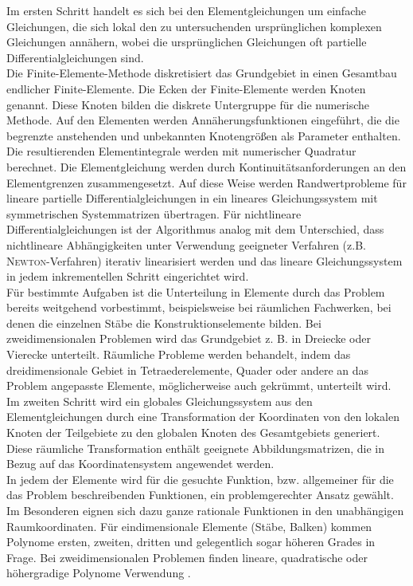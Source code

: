 \documentclass[a4paper,10pt,twoside]{article}
\numberwithin{equation}{section} %
\numberwithin{figure}{section}   %
\numberwithin{table}{section}    %
\begin{document}
	Im ersten Schritt handelt es sich bei den Elementgleichungen um einfache Gleichungen, die sich lokal den zu untersuchenden ursprünglichen komplexen Gleichungen annähern, wobei die ursprünglichen Gleichungen oft partielle Differentialgleichungen sind.\\
	
	Die Finite-Elemente-Methode diskretisiert das Grundgebiet in einen Gesamtbau endlicher Finite-Elemente. Die Ecken der Finite-Elemente werden Knoten genannt. Diese Knoten bilden die diskrete Untergruppe für die numerische Methode. Auf den Elementen werden Annäherungsfunktionen eingeführt, die die begrenzte anstehenden und unbekannten Knotengrößen als Parameter enthalten. Die resultierenden Elementintegrale werden mit numerischer Quadratur berechnet. Die Elementgleichung werden durch Kontinuitätsanforderungen an den Elementgrenzen zusammengesetzt. Auf diese Weise werden Randwertprobleme für lineare partielle Differentialgleichungen in ein lineares Gleichungssystem mit symmetrischen Systemmatrizen übertragen. Für nichtlineare Differentialgleichungen ist der Algorithmus analog mit dem Unterschied, dass nichtlineare Abhängigkeiten unter Verwendung geeigneter Verfahren (z.B. \textsc{Newton}-Verfahren) iterativ linearisiert werden und das lineare Gleichungssystem in jedem inkrementellen Schritt eingerichtet wird.\\
	
	Für bestimmte Aufgaben ist die Unterteilung in Elemente durch das Problem bereits weitgehend vorbestimmt, beispielsweise bei räumlichen Fachwerken, bei denen die einzelnen Stäbe die Konstruktionselemente bilden. Bei zweidimensionalen Problemen wird das Grundgebiet z. B. in Dreiecke oder Vierecke unterteilt. Räumliche Probleme werden behandelt, indem das dreidimensionale Gebiet in Tetraederelemente, Quader oder andere an das Problem angepasste Elemente, möglicherweise auch gekrümmt, unterteilt wird. \\
	
	Im zweiten Schritt wird ein globales Gleichungssystem aus den Elementgleichungen durch eine Transformation der Koordinaten von den lokalen Knoten der Teilgebiete zu den globalen Knoten des Gesamtgebiets generiert. Diese räumliche Transformation enthält geeignete Abbildungsmatrizen, die in Bezug auf das Koordinatensystem angewendet werden.\\
	
	In jedem der Elemente wird für die gesuchte Funktion, bzw. allgemeiner für die das Problem beschreibenden Funktionen, ein problemgerechter Ansatz gewählt. Im Besonderen eignen sich dazu ganze rationale Funktionen in den unabhängigen Raumkoordinaten.
	Für eindimensionale Elemente (Stäbe, Balken) kommen Polynome ersten, zweiten, dritten und gelegentlich sogar höheren Grades in Frage. Bei zweidimensionalen Problemen finden lineare, quadratische oder höhergradige Polynome Verwendung \cite{schwarz2013methode}. \\
	
\end{document}
